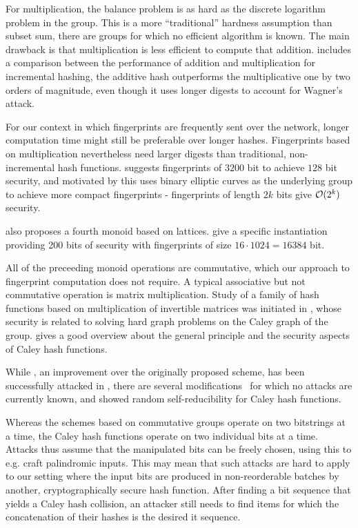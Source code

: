 For multiplication, the balance problem is as hard as the discrete logarithm problem in the group. This is a more ``traditional'' hardness assumption than subset sum, there are groups for which no efficient algorithm is known. The main drawback is that multiplication is less efficient to compute that addition. \cite{stanton2010fastad} includes a comparison between the performance of addition and multiplication for incremental hashing, the additive hash outperforms the multiplicative one by two orders of magnitude, even though it uses longer digests to account for Wagner's attack.

For our context in which fingerprints are frequently sent over the network, longer computation time might still be preferable over longer hashes. Fingerprints based on multiplication nevertheless need larger digests than traditional, non-incremental hash functions. \cite{maitin2017elliptic} suggests fingerprints of $3200$ bit to achieve $128$ bit security, and motivated by this uses binary elliptic curves as the underlying group to achieve more compact fingerprints - fingerprints of length $2k$ bits give $\mathcal{O}(2^k)$ security.

\cite{bellare1997new} also proposes a fourth monoid based on lattices. \cite{lewi2019securing} give a specific instantiation providing 200 bits of security with fingerprints of size $16 \cdot 1024 = 16384$ bit.

All of the preceeding monoid operations are commutative, which our approach to fingerprint computation does not require. A typical associative but not commutative operation is matrix multiplication. Study of a family of hash functions based on multiplication of invertible matrices was initiated in \cite{zemor1991hash}, whose security is related to solving hard graph problems on the Caley graph of the group. \cite{petit2011rubik} gives a good overview about the general principle and the security aspects of Caley hash functions.

While \cite{tillich1994hashing}, an improvement over the originally proposed scheme, has been successfully attacked in \cite{grassl2011cryptanalysis}\cite{petit2010preimages}, there are several modifications~\cite{petit2009graph}\cite{bromberg2017navigating}\cite{sosnovski2016cayley} for which no attacks are currently known, and \cite{mullan2016text} showed random self-reducibility for Caley hash functions.

Whereas the schemes based on commutative groups operate on two bitstrings at a time, the Caley hash functions operate on two individual bits at a time. Attacks thus assume that the manipulated bits can be freely chosen, using this to e.g. craft palindromic inputs. This may mean that such attacks are hard to apply to our setting where the input bits are produced in non-reorderable batches by another, cryptographically secure hash function. After finding a bit sequence that yields a Caley hash collision, an attacker still needs to find items for which the concatenation of their hashes is the desired it sequence.

